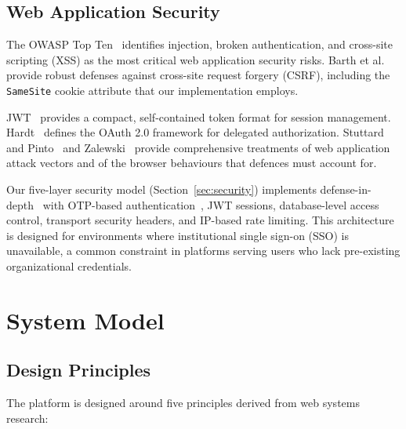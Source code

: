 \documentclass[11pt,a4paper]{article}
\theoremstyle{plain}
\theoremstyle{definition}
\theoremstyle{remark}
\begin{document}
\subsection{Web Application Security}

The OWASP Top Ten~\cite{owasp2021} identifies injection, broken authentication, and cross-site scripting (XSS) as the most critical web application security risks. Barth et al.~\cite{barth2008} provide robust defenses against cross-site request forgery (CSRF), including the \texttt{SameSite} cookie attribute that our implementation employs.

JWT~\cite{jones2015} provides a compact, self-contained token format for session management. Hardt~\cite{hardt2012} defines the OAuth 2.0 framework for delegated authorization. Stuttard and Pinto~\cite{stuttard2011} and Zalewski~\cite{zalewski2012} provide comprehensive treatments of web application attack vectors and of the browser behaviours that defences must account for.

Our five-layer security model (Section~\ref{sec:security}) implements defense-in-depth~\cite{owasp2021} with OTP-based authentication~\cite{mraihi2011}, JWT sessions, database-level access control, transport security headers, and IP-based rate limiting. This architecture is designed for environments where institutional single sign-on (SSO) is unavailable, a common constraint in platforms serving users who lack pre-existing organizational credentials.

\section{System Model}
\label{sec:model}

\subsection{Design Principles}

The platform is designed around five principles derived from web systems research:
\end{document}
